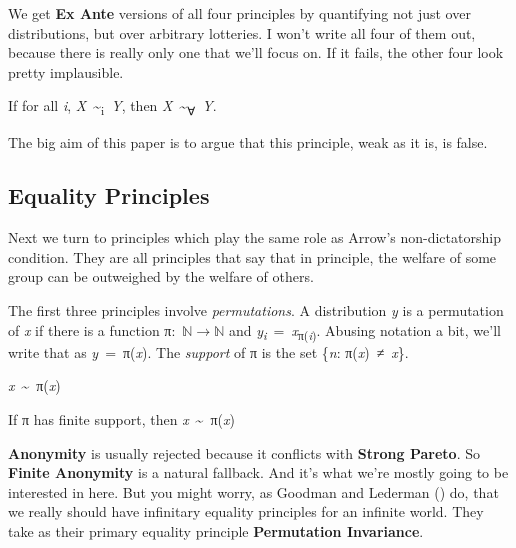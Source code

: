 \documentclass[
  11pt,
  letterpaper,
  DIV=11,
  numbers=noendperiod,
  twoside]{scrartcl}
\providecommand{\tightlist}{%
  \setlength{\itemsep}{0pt}\setlength{\parskip}{0pt}}
\begin{document}
We get \textbf{Ex Ante} versions of all four principles by quantifying
not just over distributions, but over arbitrary lotteries. I won't write
all four of them out, because there is really only one that we'll focus
on. If it fails, the other four look pretty implausible.

\begin{description}
\tightlist
\item[Ex Ante Pareto Indifference]
If for all \emph{i},
\emph{X}~\textasciitilde{}\textsubscript{i}~\emph{Y}, then
\emph{X}~\textasciitilde{}\textsubscript{∀}~\emph{Y}.
\end{description}

The big aim of this paper is to argue that this principle, weak as it
is, is false.

\subsection{Equality Principles}\label{equality-principles}

Next we turn to principles which play the same role as Arrow's
non-dictatorship condition. They are all principles that say that in
principle, the welfare of some group can be outweighed by the welfare of
others.

The first three principles involve \emph{permutations}. A distribution
\emph{y} is a permutation of \emph{x} if there is a function
π:~\(\mathbb{N} \rightarrow \mathbb{N}\) and
\emph{y\textsubscript{i}}~=~\emph{x}\textsubscript{π(\emph{i})}. Abusing
notation a bit, we'll write that as \emph{y}~=~π(\emph{x}). The
\emph{support} of π is the set \{\emph{n}: π(\emph{x})~≠~\emph{x}\}.

\begin{description}
\tightlist
\item[Anonymity]
\emph{x}~\textasciitilde~π(\emph{x})
\item[Finite Anonymity]
If π has finite support, then \emph{x}~\textasciitilde~π(\emph{x})
\end{description}

\textbf{Anonymity} is usually rejected because it conflicts with
\textbf{Strong Pareto}. So \textbf{Finite Anonymity} is a natural
fallback. And it's what we're mostly going to be interested in here. But
you might worry, as Goodman and Lederman
() do, that we really should
have infinitary equality principles for an infinite world. They take as
their primary equality principle \textbf{Permutation Invariance}.
\end{document}
